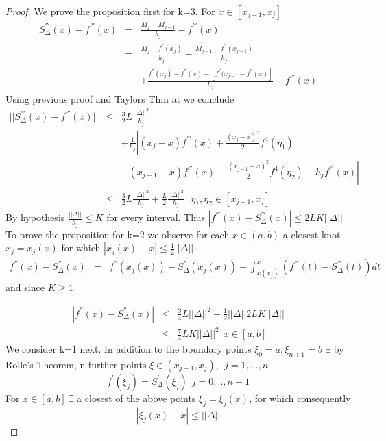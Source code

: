 \begin{proof}
We prove the proposition first for k=3.
For $x \in [x_{j-1},x_j]$
\begin{eqnarray*}
S^{'''}_{\Delta}(x)-f^{'''}(x)& = &\frac{M_j-M_{j-1}}{h_j} - f^{'''}(x)\\
& = & \frac{M_j - f^{''}(x_j)}{h_j} -\frac{M_{j-1}-f^{''}(x_{j-1})}{h_j}\\
& & + \frac{f^{''}(x_j)-f^{''}(x) - [f^{''}(x_{j-1}-f^{''}(x)]}{h_j} -f^{'''}(x)
\end{eqnarray*}
Using previous proof and Taylors Thm at we conclude
\begin{eqnarray*}
 ||S^{'''}_{\Delta}(x)-f^{'''}(x)|| &\leq& \frac{3}{2}L\frac{||\Delta||^2}{h_j}\\
& & + \frac{1}{h_j} \left|(x_j-x)f^{'''}(x) + \frac{(x_j-x)^2}{2} f^4(\eta_1)\right.\\
& & \left.- (x_{j-1}-x)f^{'''}(x) + \frac{(x_{j-1}-x)^2}{2} f^4(\eta_2) - h_jf^{'''}(x) \right| \\
&\leq& \frac{3}{2} L \frac{||\Delta||^2}{h_j} + \frac{L}{2} \frac{||\Delta||^{2}}{h_j} \ \ \ \eta_1,\eta_2 \in [x_{j-1},x_{j}]
\end{eqnarray*}
By hypothesis $\frac{||\Delta||}{h_j} \leq K $ for every interval.
Thus $|f^{'''}(x) - S^{'''}_{\Delta}(x)| \leq 2LK||\Delta||$
To prove the proposition for k=2 we observe for each $x \in (a,b)$ a closest
knot $x_j = x_j(x)$ for which $|x_j(x) - x| \leq \frac{1}{2}||\Delta||$.
\begin{eqnarray*}
f^{''}(x) - S_{\Delta}^{''}(x) & = & f^{''}(x_j(x)) - S_{\Delta}^{''}(x_j(x)) 
+ \int^{x}_{x(x_j)}(f^{'''}(t)-S_{\Delta}^{'''}(t))dt
\end{eqnarray*}
and since $K \geq 1$

\begin{eqnarray*}
|f^{''}(x) - S_{\Delta}^{''}(x)| & \leq & \frac{3}{4} L ||\Delta||^2 +\frac{1}{2}||\Delta||2LK||\Delta|| \\
& \leq & \frac{7}{4}LK||\Delta||^2  \ \ x \in [a,b]
\end{eqnarray*}
We consider k=1 next. In addition to the boundary points $\xi_0 = a, \xi_{n+1}=b$
$\exists$ by Rolle's Theorem, n further points $\xi \in (x_{j-1},x_j),\ \ j=1,...,n$
\[
f^{'}(\xi_j) = S_{\Delta}^{'}(\xi_j) \ \ j=0,..,n+1
\]
For $x \in [a,b] \ \exists$ a closest of the above points $\xi_j = \xi_j(x)$, for
which consequently 
\[
|\xi_j(x)-x| \leq ||\Delta||
\]


\end{proof}
